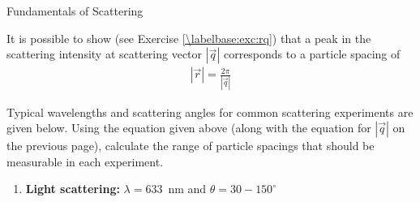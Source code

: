 \begin{activity}{Fundamentals of Scattering}
\begin{ctqs}
\end{ctqs}

\begin{infobox}

	It is possible to show (see Exercise \ref{\labelbase:exc:rq}) that a peak in the scattering intensity at scattering vector $|\vec q|$ corresponds to a particle spacing of \label{\labelbase:eqn:rq}
		\begin{align*}
			|\vec r| = \frac{2\pi}{|\vec q|}
		\end{align*}
		
\end{infobox}

\begin{ctqs}

	\question Typical wavelengths and scattering angles for common scattering experiments are given below.  Using the equation given above (along with the equation for $|\vec q|$ on the previous page), calculate the range of particle spacings that should be measurable in each experiment. \label{\labelbase:ctq:calcrranges}


	\begin{enumerate}
		\item \textbf{Light scattering:} $\lambda = 633$~nm and $\theta = 30-150^\circ$
		

\end{enumerate}
\end{ctqs}
\end{activity}
